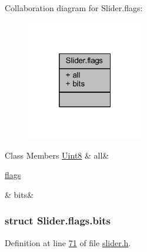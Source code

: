 Collaboration diagram for Slider.\+flags\+:
\nopagebreak
\begin{figure}[H]
\begin{center}
\leavevmode
\includegraphics[width=145pt]{db/d10/a00350}
\end{center}
\end{figure}
\begin{DoxyFields}{Class Members}
\hypertarget{a00078_aa181a603769c1f98ad927e7367c7aa51}{\hyperlink{a00004_a979e3e23b9a449e69ab6a8a83b6042f8}{Uint8}}\label{a00078_aa181a603769c1f98ad927e7367c7aa51}
&
all&
\\
\hline

\hypertarget{a00078_acc411e6c13670e52124629b8ac83f7d0}{\hyperlink{a00078_d5/d0b/a00220}{flags}}\label{a00078_acc411e6c13670e52124629b8ac83f7d0}
&
bits&
\\
\hline

\end{DoxyFields}
\label{d5/d0b/a00220}
\hypertarget{a00078_d5/d0b/a00220}{}
\subsubsection{struct Slider.\+flags.\+bits}


Definition at line \hyperlink{a00078_source_l00071}{71} of file \hyperlink{a00078_source}{slider.\+h}.



